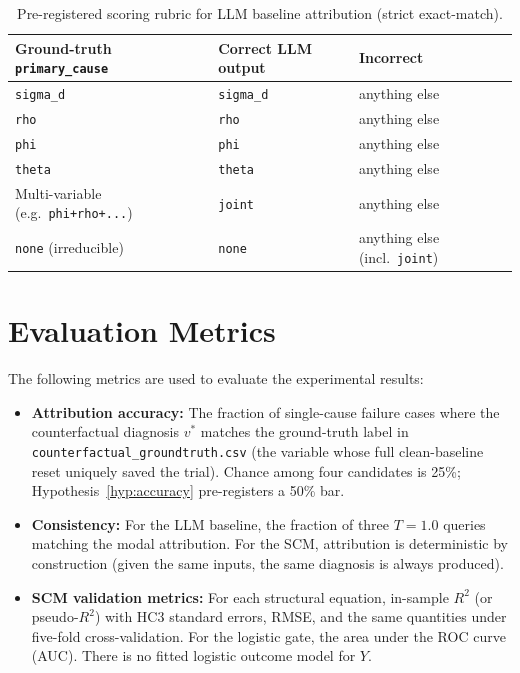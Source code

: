 \documentclass[11pt,a4paper]{report}
\begin{document}
\begin{table}[t]
  \caption{Pre-registered scoring rubric for LLM baseline attribution (strict exact-match).}
  \label{tab:llm_rubric}
  \centering
  \small
  \begin{tabular}{lll}
    \toprule
    \textbf{Ground-truth \texttt{primary\_cause}} & \textbf{Correct LLM output} & \textbf{Incorrect} \\
    \midrule
    \texttt{sigma\_d}            & \texttt{sigma\_d} & anything else \\
    \texttt{rho}                 & \texttt{rho}      & anything else \\
    \texttt{phi}                 & \texttt{phi}      & anything else \\
    \texttt{theta}               & \texttt{theta}    & anything else \\
    Multi-variable (e.g.\ \texttt{phi+rho+...}) & \texttt{joint} & anything else \\
    \texttt{none} (irreducible)  & \texttt{none}     & anything else (incl.\ \texttt{joint}) \\
    \bottomrule
  \end{tabular}
\end{table}


\section{Evaluation Metrics}
\label{sec:metrics}

The following metrics are used to evaluate the experimental results:

\begin{itemize}
  \item \textbf{Attribution accuracy:} The fraction of single-cause failure cases where the counterfactual diagnosis $v^*$ matches the ground-truth label in \texttt{counterfactual\_groundtruth.csv} (the variable whose full clean-baseline reset uniquely saved the trial). Chance among four candidates is 25\%; Hypothesis~\ref{hyp:accuracy} pre-registers a 50\% bar.

  \item \textbf{Consistency:} For the LLM baseline, the fraction of three $T{=}1.0$ queries matching the modal attribution. For the SCM, attribution is deterministic by construction (given the same inputs, the same diagnosis is always produced).

  \item \textbf{SCM validation metrics:} For each structural equation, in-sample $R^2$ (or pseudo-$R^2$) with HC3 standard errors, RMSE, and the same quantities under five-fold cross-validation. For the logistic gate, the area under the ROC curve (AUC). There is no fitted logistic outcome model for $Y$.
\end{itemize}
\end{document}

